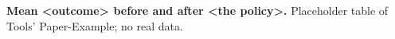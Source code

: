 \begin{table}
  \centering
  \caption{\textbf{Mean <outcome> before and after <the policy>.} Placeholder table of Tools' Paper-Example; no real data.}
  \label{tab:example}
  
\end{table}
